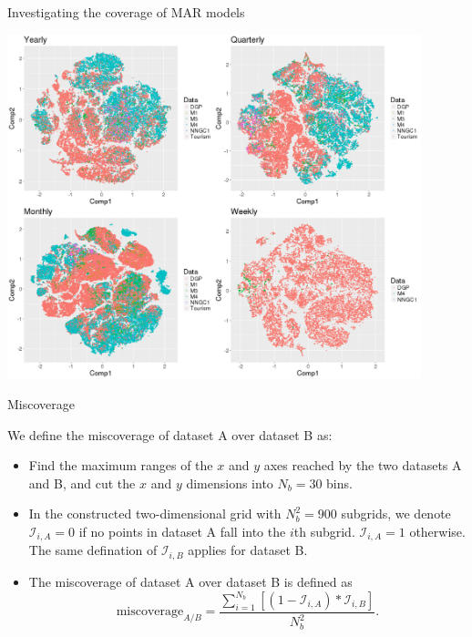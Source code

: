 \documentclass[11pt,ignorenonframetext,compress]{beamer}
\providecommand{\tightlist}{%
  \setlength{\itemsep}{0pt}\setlength{\parskip}{0pt}}
\begin{document}
\begin{frame}{Investigating the coverage of MAR models}

  \centerline{\includegraphics[width=0.9\textwidth]{figures/coverage.png}}

\end{frame}

\begin{frame}{Miscoverage}

  We define the miscoverage of dataset A over dataset B as:

  \begin{itemize}
    \def\labelenumi{\arabic{enumi}.}
    \tightlist
  \item
    Find the maximum ranges of the \(x\) and \(y\) axes reached by the two
    datasets A and B, and cut the \(x\) and \(y\) dimensions into
    \(N_b = 30\) bins.
  \item
    In the constructed two-dimensional grid with \(N_b^2 = 900\) subgrids,
    we denote \(\mathcal{I}_{i,A} = 0\) if no points in dataset A fall
    into the \(i\)th subgrid. \(\mathcal{I}_{i,A} = 1\) otherwise. The
    same defination of \(\mathcal{I}_{i,B}\) applies for dataset B.
  \item
    The miscoverage of dataset A over dataset B is defined as
    \[\text{miscoverage}_{A/B} = \frac{\sum\limits_{i = 1}^{N_b}[(1 - \mathcal{I}_{i,A})*\mathcal{I}_{i,B}]}{N_b^2}.\]
  \end{itemize}

\end{frame}
\end{document}
